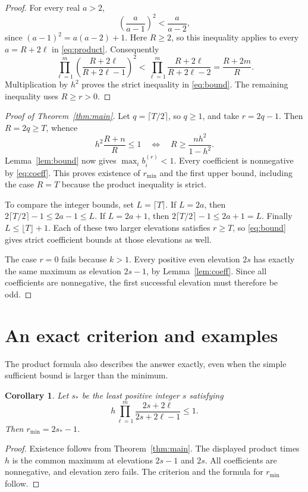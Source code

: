 \documentclass[11pt]{article}
\newtheorem{corollary}[theorem]{Corollary}
\begin{document}
\begin{proof}
For every real $a>2$,
\[
\left(\frac a{a-1}\right)^2<\frac a{a-2},
\]
since $(a-1)^2=a(a-2)+1$. Here $R\ge2$, so this inequality applies
to every $a=R+2\ell$ in \eqref{eq:product}. Consequently
\[
\prod_{\ell=1}^m\left(\frac{R+2\ell}{R+2\ell-1}\right)^2
<\prod_{\ell=1}^m\frac{R+2\ell}{R+2\ell-2}
=\frac{R+2m}{R}.
\]
Multiplication by $h^2$ proves the strict inequality in
\eqref{eq:bound}. The remaining inequality uses $R\ge r>0$.
\end{proof}

\begin{proof}[Proof of Theorem~\ref{thm:main}]
Let $q=\lceil T/2\rceil$, so $q\ge1$, and take $r=2q-1$. Then
$R=2q\ge T$, whence
\[
h^2\frac{R+n}{R}\le1
\quad\Longleftrightarrow\quad
R\ge\frac{nh^2}{1-h^2}.
\]
Lemma~\ref{lem:bound} now gives $\max_i b_i^{(r)}<1$.
Every coefficient is nonnegative by \eqref{eq:coeff}. This proves
existence of $r_{\min}$ and the first upper bound, including the case
$R=T$ because the product inequality is strict.

To compare the integer bounds, set $L=\lceil T\rceil$. If $L=2a$,
then $2\lceil T/2\rceil-1\le2a-1\le L$. If $L=2a+1$,
then $2\lceil T/2\rceil-1\le2a+1=L$.
Finally $L\le\lfloor T\rfloor+1$. Each of these two larger elevations
satisfies $r\ge T$, so \eqref{eq:bound} gives strict coefficient
bounds at those elevations as well.

The case $r=0$ fails because $k>1$. Every positive even elevation
$2s$ has exactly the same maximum as elevation $2s-1$, by
Lemma~\ref{lem:coeff}. Since all coefficients are nonnegative, the
first successful elevation must therefore be odd.
\end{proof}

\section{An exact criterion and examples}
The product formula also describes the answer exactly, even when the
simple sufficient bound is larger than the minimum.

\begin{corollary}\label{cor:exact}
Let $s_*$ be the least positive integer $s$ satisfying
\[
h\prod_{\ell=1}^m\frac{2s+2\ell}{2s+2\ell-1}\le1.
\]
Then $r_{\min}=2s_*-1$.
\end{corollary}

\begin{proof}
Existence follows from Theorem~\ref{thm:main}. The displayed product
times $h$ is the common maximum at elevations $2s-1$ and $2s$.
All coefficients are nonnegative, and elevation zero fails.
The criterion and the formula for $r_{\min}$ follow.
\end{proof}
\end{document}
